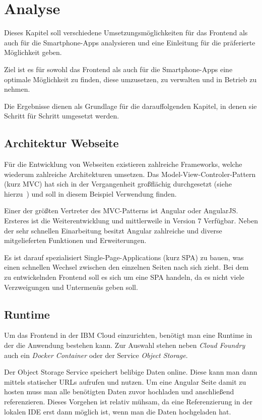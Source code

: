 \section{Analyse}
Dieses Kapitel soll verschiedene Umsetzungsmöglichkeiten für das Frontend als auch für die Smartphone-Apps analysieren
und eine Einleitung für die präferierte Möglichkeit geben.

Ziel ist es für sowohl das Frontend als auch für die Smartphone-Apps eine optimale Möglichkeit zu finden, diese
umzusetzen, zu verwalten und in Betrieb zu nehmen.

Die Ergebnisse dienen als Grundlage für die darauffolgenden Kapitel, in denen sie Schritt für Schritt umgesetzt werden.

\subsection{Architektur Webseite}
Für die Entwicklung von Webseiten existieren zahlreiche Frameworks, welche wiederum zahlreiche Architekturen umsetzen.
Das Model-View-Controler-Pattern (kurz MVC) hat sich in der Vergangenheit großflächig durchgesetzt (siehe
hierzu~\cite{book_grundlagen_mvc}) und soll in diesem Beispiel Verwendung finden.

Einer der größten Vertreter des MVC-Patterns ist Angular oder AngularJS. Ersteres ist die Weiterentwicklung und
mittlerweile in Version 7 Verfügbar. Neben der sehr schnellen Einarbeitung besitzt Angular zahlreiche und diverse
mitgelieferten Funktionen und Erweiterungen.

Es ist darauf spezialisiert Single-Page-Applications (kurz SPA) zu bauen, was einen schnellen Wechsel zwischen den
einzelnen Seiten nach sich zieht. Bei dem zu entwickelnden Frontend soll es sich um eine SPA handeln, da es nicht viele
Verzweigungen und Untermenüs geben soll.

\subsection{Runtime}
Um das Frontend in der IBM Cloud einzurichten, benötigt man eine Runtime in der die Anwendung bestehen kann. Zur
Auswahl stehen neben \textit{Cloud Foundry} auch ein \textit{Docker Container} oder der Service \textit{Object Storage}.

Der Object Storage Service speichert belibige Daten online. Diese kann man dann mittels statischer URLs aufrufen und
nutzen. Um eine Angular Seite damit zu hosten muss man alle benötigten Daten zuvor hochladen und anschließend
referenzieren. Dieses Vorgehen ist relativ mühsam, da eine Referenzierung in der lokalen IDE erst dann möglich ist, wenn
man die Daten hochgeladen hat.

